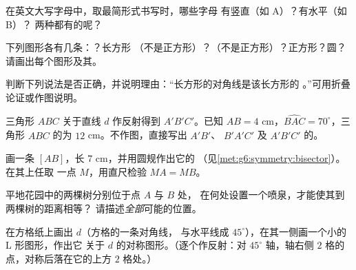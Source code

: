 \begin{exercise}[$\star$]\label{exo:g6:symmetry:3}
在英文大写字母中，取最简形式书写时，哪些字母
有竖直（如 A）？有水平（如 B）？
两种都有的呢？
\end{exercise}

\begin{exercise}[$\star$]\label{exo:g6:symmetry:4}
下列图形各有几条：？长方形
（不是正方形）？（不是正方形）？正方形？圆？
请画出每个图形及其。
\end{exercise}

\begin{exercise}[$\star$]\label{exo:g6:symmetry:5}
判断下列说法是否正确，并说明理由：“长方形的对角线是该长方形的
。”可用折叠论证或作图说明。
\end{exercise}

\begin{exercise}[$\star$]\label{exo:g6:symmetry:6}
三角形 $ABC$ 关于直线 $d$ 作反射得到 $A'B'C'$。已知
$AB = 4$ cm，$\widehat{BAC} = 70^\circ$，三角形 $ABC$ 的为
$12$ cm。不作图，直接写出 $A'B'$、
$\widehat{B'A'C'}$ 及 $A'B'C'$ 的。
\end{exercise}

\begin{exercise}[$\star$]\label{exo:g6:symmetry:7}
画一条 $[AB]$，长 $7$ cm，并用圆规作出它的
（见\cref{met:g6:symmetry:bisector}）。在其上任取
一点 $M$，用直尺检验 $MA = MB$。
\end{exercise}

\begin{exercise}[$\star\star$]\label{exo:g6:symmetry:8}
平地花园中的两棵树分别位于点 $A$ 与 $B$ 处，
在何处设置一个喷泉，才能使其到两棵树的距离相等？
请描述\emph{全部}可能的位置。
\end{exercise}

\begin{exercise}[$\star\star$]\label{exo:g6:symmetry:9}
在方格纸上画出 $d$（方格的一条对角线，
与水平线成 $45^\circ$），在其一侧画一个小的 L 形图形，作出它
关于 $d$ 的对称图形。（逐个作反射：对 $45^\circ$
轴，轴右侧 $2$ 格的点，对称后落在它的上方
$2$ 格处。）
\end{exercise}

